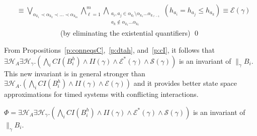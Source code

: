 \documentclass{LMCS}
\newcommand{\hp}{\mathcal{H}_A}
\newcommand{\ha}{\mathcal{H}_{\gamma}}
\newcommand{\eqs}{\mathcal{E}}
\newcommand{\eqsc}{\mathcal{E}^*}
\newcommand{\cn}{\mathit{B}\xspace}
\newcommand{\ic}{\mathit{CI}}
\newcommand{\iim}{\mathit{II}}
\newcommand{\sep}{\mathcal{S}}
\theoremstyle{plain}\newtheorem{remark}[thm]{Remark}
\theoremstyle{plain}\newtheorem{example}[thm]{Example}
\begin{document}
\begin{align*}
&  \equiv \bigvee\limits_{\alpha_{k_1} \prec \alpha_{k_2} \prec ... \prec \alpha_{k_m}} 
\bigwedge_{\ell = 1}^m \bigwedge_{\substack{a_i,a_j \in \alpha_{k_\ell} \setminus \alpha_{k_1} ... \alpha_{k_{\ell-1}} \\ 
  a_k \not\in \alpha_{k_1} ... \alpha_{k_\ell}}} (h_{a_i} = h_{a_j} \le h_{a_k}) \equiv \eqs(\gamma) 
\end{align*}
$\qquad \qquad \qquad\qquad$(by eliminating the existential quantifiers) \qed\medskip

\noindent From Propositions~\ref{p:conneqsC},~\ref{p:dtah}, and~\ref{p:cI}, it
follows that $\exists \hp \exists \ha. (\bigwedge_i \ic(\cn_i^h) \wedge
\iim(\gamma) \wedge \eqsc(\gamma) \wedge \sep(\gamma))$ is an invariant of
$ \|_{\gamma}\cn_i$. This new invariant is in general stronger than
$\exists \hp. (\bigwedge_i \ic(\cn_i^h) \wedge \iim( \gamma) \wedge
\eqs(\gamma))$ and it provides better state space approximations for timed
systems with conflicting interactions.

\begin{cor}
$\Phi = \exists \hp \exists \ha. (\bigwedge_i \ic(\cn_i^h) \wedge
\iim(\gamma) \wedge \eqsc(\gamma) \wedge \sep(\gamma))$ is an invariant of  $\|_{\gamma}\cn_i$.
\end{cor}
\end{document}
